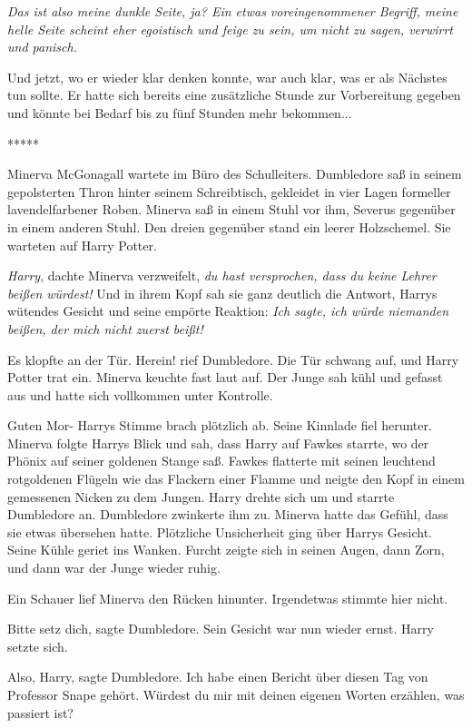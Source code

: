 \emph{Das ist also meine dunkle Seite, ja? Ein etwas voreingenommener Begriff,
meine helle Seite scheint eher egoistisch und feige zu sein, um nicht zu sagen,
verwirrt und panisch.}

Und jetzt, wo er wieder klar denken konnte, war auch klar, was er als Nächstes
tun sollte. Er hatte sich bereits eine zusätzliche Stunde zur Vorbereitung
gegeben und könnte bei Bedarf bis zu fünf Stunden mehr bekommen...

\begin{center}*****\end{center}

Minerva McGonagall wartete im Büro des Schulleiters. Dumbledore saß in seinem
gepolsterten Thron hinter seinem Schreibtisch, gekleidet in vier Lagen formeller
lavendelfarbener Roben. Minerva saß in einem Stuhl vor ihm, Severus gegenüber in
einem anderen Stuhl. Den dreien gegenüber stand ein leerer Holzschemel. Sie
warteten auf Harry Potter.

\emph{Harry}, dachte Minerva verzweifelt, \emph{du hast versprochen, dass du
keine Lehrer beißen würdest!} Und in ihrem Kopf sah sie ganz deutlich die
Antwort, Harrys wütendes Gesicht und seine empörte Reaktion: \emph{Ich sagte,
ich würde niemanden beißen, der mich nicht zuerst beißt!}

Es klopfte an der Tür. \glqq{}Herein!\grqq{} rief Dumbledore. Die Tür schwang
auf, und Harry Potter trat ein. Minerva keuchte fast laut auf. Der Junge sah
kühl und gefasst aus und hatte sich vollkommen unter Kontrolle.

\glqq{}Guten Mor-\grqq{} Harrys Stimme brach plötzlich ab. Seine Kinnlade fiel
herunter. Minerva folgte Harrys Blick und sah, dass Harry auf Fawkes starrte, wo
der Phönix auf seiner goldenen Stange saß. Fawkes flatterte mit seinen leuchtend
rotgoldenen Flügeln wie das Flackern einer Flamme und neigte den Kopf in einem
gemessenen Nicken zu dem Jungen. Harry drehte sich um und starrte Dumbledore an.
Dumbledore zwinkerte ihm zu. Minerva hatte das Gefühl, dass sie etwas übersehen
hatte. Plötzliche Unsicherheit ging über Harrys Gesicht. Seine Kühle geriet ins
Wanken. Furcht zeigte sich in seinen Augen, dann Zorn, und dann war der Junge
wieder ruhig.

Ein Schauer lief Minerva den Rücken hinunter. Irgendetwas stimmte hier nicht.

\glqq{}Bitte setz dich\grqq{}, sagte Dumbledore. Sein Gesicht war nun wieder
ernst. Harry setzte sich.

\glqq{}Also, Harry\grqq{}, sagte Dumbledore. \glqq{}Ich habe einen Bericht über
diesen Tag von Professor Snape gehört. Würdest du mir mit deinen eigenen Worten
erzählen, was passiert ist?\grqq{}

